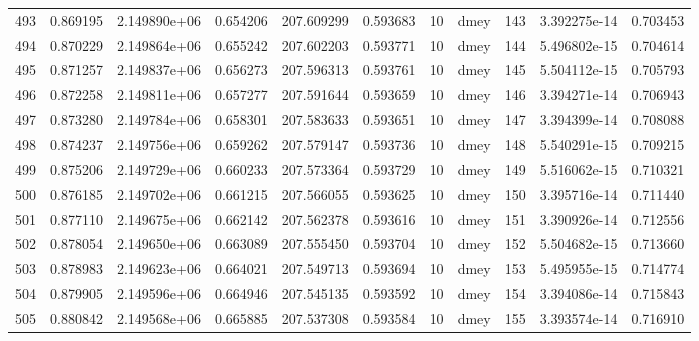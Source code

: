 \begin{tabular}{lrrrrrrlrrr}
493  &    0.869195 &        2.149890e+06 &  0.654206 &              207.609299 &    0.593683 &      10 &         dmey &    143 &   3.392275e-14 &      0.703453 \\
494  &    0.870229 &        2.149864e+06 &  0.655242 &              207.602203 &    0.593771 &      10 &         dmey &    144 &   5.496802e-15 &      0.704614 \\
495  &    0.871257 &        2.149837e+06 &  0.656273 &              207.596313 &    0.593761 &      10 &         dmey &    145 &   5.504112e-15 &      0.705793 \\
496  &    0.872258 &        2.149811e+06 &  0.657277 &              207.591644 &    0.593659 &      10 &         dmey &    146 &   3.394271e-14 &      0.706943 \\
497  &    0.873280 &        2.149784e+06 &  0.658301 &              207.583633 &    0.593651 &      10 &         dmey &    147 &   3.394399e-14 &      0.708088 \\
498  &    0.874237 &        2.149756e+06 &  0.659262 &              207.579147 &    0.593736 &      10 &         dmey &    148 &   5.540291e-15 &      0.709215 \\
499  &    0.875206 &        2.149729e+06 &  0.660233 &              207.573364 &    0.593729 &      10 &         dmey &    149 &   5.516062e-15 &      0.710321 \\
500  &    0.876185 &        2.149702e+06 &  0.661215 &              207.566055 &    0.593625 &      10 &         dmey &    150 &   3.395716e-14 &      0.711440 \\
501  &    0.877110 &        2.149675e+06 &  0.662142 &              207.562378 &    0.593616 &      10 &         dmey &    151 &   3.390926e-14 &      0.712556 \\
502  &    0.878054 &        2.149650e+06 &  0.663089 &              207.555450 &    0.593704 &      10 &         dmey &    152 &   5.504682e-15 &      0.713660 \\
503  &    0.878983 &        2.149623e+06 &  0.664021 &              207.549713 &    0.593694 &      10 &         dmey &    153 &   5.495955e-15 &      0.714774 \\
504  &    0.879905 &        2.149596e+06 &  0.664946 &              207.545135 &    0.593592 &      10 &         dmey &    154 &   3.394086e-14 &      0.715843 \\
505  &    0.880842 &        2.149568e+06 &  0.665885 &              207.537308 &    0.593584 &      10 &         dmey &    155 &   3.393574e-14 &      0.716910 \\

\end{tabular}
